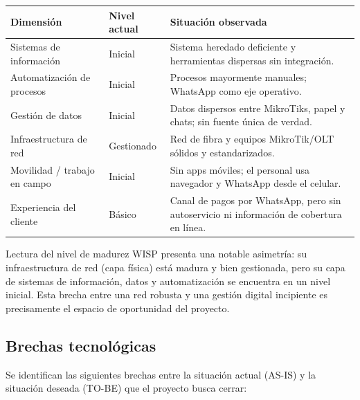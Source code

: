 \begin{center}
\label{tab:madurez}
\begin{tabularx}{\textwidth}{L{3cm} L{2.2cm} X}
\toprule
\textbf{Dimensión} & \textbf{Nivel actual} & \textbf{Situación observada} \\
\midrule
Sistemas de información & Inicial &
Sistema heredado deficiente y herramientas dispersas sin integración. \\
Automatización de procesos & Inicial &
Procesos mayormente manuales; WhatsApp como eje operativo. \\
Gestión de datos & Inicial &
Datos dispersos entre MikroTiks, papel y chats; sin fuente única de verdad. \\
Infraestructura de red & Gestionado &
Red de fibra y equipos MikroTik/OLT sólidos y estandarizados. \\
Movilidad / trabajo en campo & Inicial &
Sin apps móviles; el personal usa navegador y WhatsApp desde el celular. \\
Experiencia del cliente & Básico &
Canal de pagos por WhatsApp, pero sin autoservicio ni información de cobertura en línea. \\
\bottomrule
\end{tabularx}
\end{center}

\begin{upeubox}{Lectura del nivel de madurez}
WISP presenta una notable asimetría: su infraestructura de red (capa física) está
madura y bien gestionada, pero su capa de sistemas de información, datos y
automatización se encuentra en un nivel inicial. Esta brecha entre una red robusta y
una gestión digital incipiente es precisamente el espacio de oportunidad del proyecto.
\end{upeubox}

\subsection{Brechas tecnológicas}

Se identifican las siguientes brechas entre la situación actual (AS-IS) y la
situación deseada (TO-BE) que el proyecto busca cerrar:

